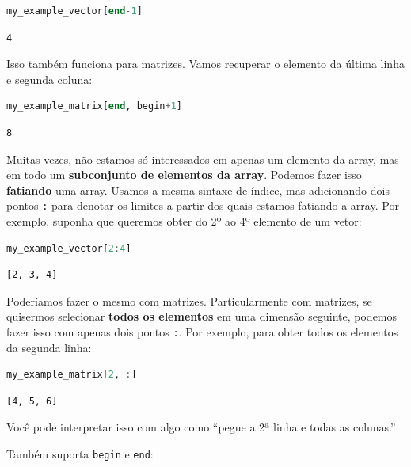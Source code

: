 \documentclass[
  notoc %
]{tufte-book}
\newcommand{\passthrough}[1]{#1}
\begin{document}
\begin{lstlisting}[language=Julia]
my_example_vector[end-1]
\end{lstlisting}

\begin{lstlisting}[language=Output]
4
\end{lstlisting}

Isso também funciona para matrizes. Vamos recuperar o elemento da última
linha e segunda coluna:

\begin{lstlisting}[language=Julia]
my_example_matrix[end, begin+1]
\end{lstlisting}

\begin{lstlisting}[language=Output]
8
\end{lstlisting}

Muitas vezes, não estamos só interessados em apenas um elemento da
array, mas em todo um \textbf{subconjunto de elementos da array}.
Podemos fazer isso \textbf{fatiando} uma array. Usamos a mesma sintaxe
de índice, mas adicionando dois pontos \passthrough{\lstinline!:!} para
denotar os limites a partir dos quais estamos fatiando a array. Por
exemplo, suponha que queremos obter do 2º ao 4º elemento de um vetor:

\begin{lstlisting}[language=Julia]
my_example_vector[2:4]
\end{lstlisting}

\begin{lstlisting}[language=Output]
[2, 3, 4]
\end{lstlisting}

Poderíamos fazer o mesmo com matrizes. Particularmente com matrizes, se
quisermos selecionar \textbf{todos os elementos} em uma dimensão
seguinte, podemos fazer isso com apenas dois pontos
\passthrough{\lstinline!:!}. Por exemplo, para obter todos os elementos
da segunda linha:

\begin{lstlisting}[language=Julia]
my_example_matrix[2, :]
\end{lstlisting}

\begin{lstlisting}[language=Output]
[4, 5, 6]
\end{lstlisting}

Você pode interpretar isso com algo como ``pegue a 2ª linha e todas as
colunas.''

Também suporta \passthrough{\lstinline!begin!} e
\passthrough{\lstinline!end!}:
\end{document}
